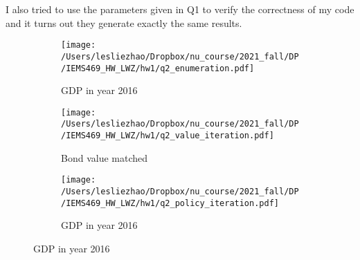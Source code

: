 \documentclass[12pt,letterpaper]{article}
\begin{document}
I also tried to use the parameters given in Q1 to verify the correctness of my code and it turns out they generate exactly the same results.
\begin{figure}[H] 
	\centering
	\caption{Option Characteristics}
	\begin{subfigure}[h]{0.48\textwidth}
		\centering
		\texttt{[image: /Users/lesliezhao/Dropbox/nu\_course/2021\_fall/DP/IEMS469\_HW\_LWZ/hw1/q2\_enumeration.pdf]}
		\caption{GDP in year 2016}
	\end{subfigure}
	\begin{subfigure}[h]{0.48\textwidth}
		\centering
		\texttt{[image: /Users/lesliezhao/Dropbox/nu\_course/2021\_fall/DP/IEMS469\_HW\_LWZ/hw1/q2\_value\_iteration.pdf]}
		\caption{Bond value matched}
	\end{subfigure}
	\begin{subfigure}[h]{0.48\textwidth}
		\centering
		\texttt{[image: /Users/lesliezhao/Dropbox/nu\_course/2021\_fall/DP/IEMS469\_HW\_LWZ/hw1/q2\_policy\_iteration.pdf]}
		\caption{GDP in year 2016}
	\end{subfigure}
	\label{votemap}
\end{figure}
\clearpage
\setlength\bibsep{0pt}


\end{document}
